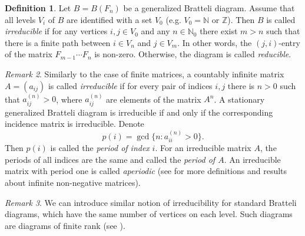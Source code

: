 \documentclass[11pt, twoside]{amsart}
\theoremstyle{definition}
\newtheorem{definition}{Definition}[section]
\theoremstyle{remark}
\newtheorem{remark}[definition]{Remark}
\theoremstyle{plain}
\newcommand{\tcb}{\textcolor{blue}}
\newcommand{\tcr}{\textcolor{red}}
\newcommand{\N}{\mathbb N}
\numberwithin{equation}{section}
\begin{document}




\begin{definition}\label{Def:irreducible_GBD} 
Let $B = B(F_n)$ be
a generalized Bratteli diagram. Assume that all levels $V_i$ of $B$ are identified with a set $V_0$ (e.g. $V_0 = 
\mathbb{N}$ or $\mathbb{Z}$). Then $B$ is called  \textit{irreducible} if 
for any vertices $i, j \in V_0$ and any $n \in \N_0$ there exist 
$m 
> n$ such that there is a finite path between $i \in V_n$ and $j \in V_m$. In 
other words, the $(j, i)$-entry of the matrix $F_{m-1} \cdots 
F_n$ 
is non-zero. Otherwise, the diagram is called \textit{reducible}.
\end{definition}


\begin{remark}
Similarly to the case of finite matrices, a countably infinite matrix $A = (a_{ij})$ is called 
\textit{irreducible} if for every pair of indices $i,j$ there 
is $n > 0$ such that $a^{(n)}_{ij} > 0$, where $a^{(n)}_{ij}$ are elements of the matrix $A^n$. 
A stationary generalized Bratteli diagram is
irreducible if and only if the corresponding incidence matrix is 
irreducible.
Denote $$
p(i) = \gcd\{n:a^{(n)}_{ii} > 0\}.
$$
Then $p(i)$ is called the \textit{period of index} $i$. For an 
irreducible matrix $A$, the periods of all indices are the same 
and called the \textit{period of $A$}. An irreducible matrix with 
period one is called \textit{aperiodic} (see \cite{Kitchens1998} for 
more definitions and results about infinite non-negative matrices).
\end{remark}

\begin{remark}
    We can introduce similar notion of irreducibility for standard Bratteli diagrams, which have the same number of vertices on each level. Such diagrams are diagrams of finite rank (see \cite{BezuglyiKwiatkowskiMedynetsSolomyak2013}). 
\end{remark}
\end{document}
